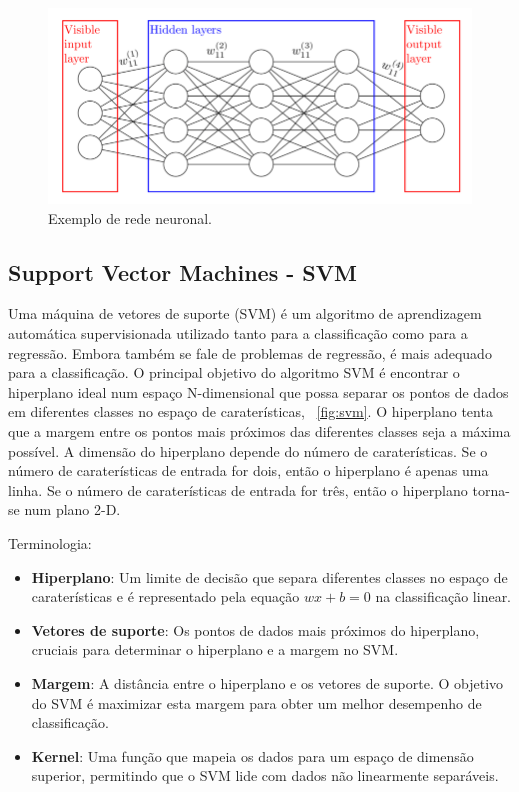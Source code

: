 \documentclass[conference]{IEEEtran}
\begin{document}
\begin{figure}
	\centering
	\includegraphics[width=0.9\linewidth]{NN}
	\caption{Exemplo de rede neuronal.}
	\label{fig:nn}
\end{figure}



\subsection{Support Vector Machines - SVM}

Uma máquina de vetores de suporte (SVM) é um algoritmo de aprendizagem automática supervisionada utilizado tanto para a classificação como para a regressão. Embora também se fale de problemas de regressão, é mais adequado para a classificação. O principal objetivo do algoritmo SVM é encontrar o hiperplano ideal num espaço N-dimensional que possa separar os pontos de dados em diferentes classes no espaço de caraterísticas, \figurename~\ref{fig:svm}. O hiperplano tenta que a margem entre os pontos mais próximos das diferentes classes seja a máxima possível. A dimensão do hiperplano depende do número de caraterísticas. Se o número de caraterísticas de entrada for dois, então o hiperplano é apenas uma linha. Se o número de caraterísticas de entrada for três, então o hiperplano torna-se num plano 2-D. \cite{madureira2024svm}

Terminologia:

\begin{itemize}
	\item \textbf{Hiperplano}: Um limite de decisão que separa diferentes classes no espaço de caraterísticas e é representado pela equação $wx + b = 0$ na classificação linear.
	
	\item \textbf{Vetores de suporte}: Os pontos de dados mais próximos do hiperplano, cruciais para determinar o hiperplano e a margem no SVM.
	
	\item \textbf{Margem}: A distância entre o hiperplano e os vetores de suporte. O objetivo do SVM é maximizar esta margem para obter um melhor desempenho de classificação.
	
	\item \textbf{Kernel}: Uma função que mapeia os dados para um espaço de dimensão superior, permitindo que o SVM lide com dados não linearmente separáveis. \cite{madureira2024svm}
\end{itemize}
\end{document}
